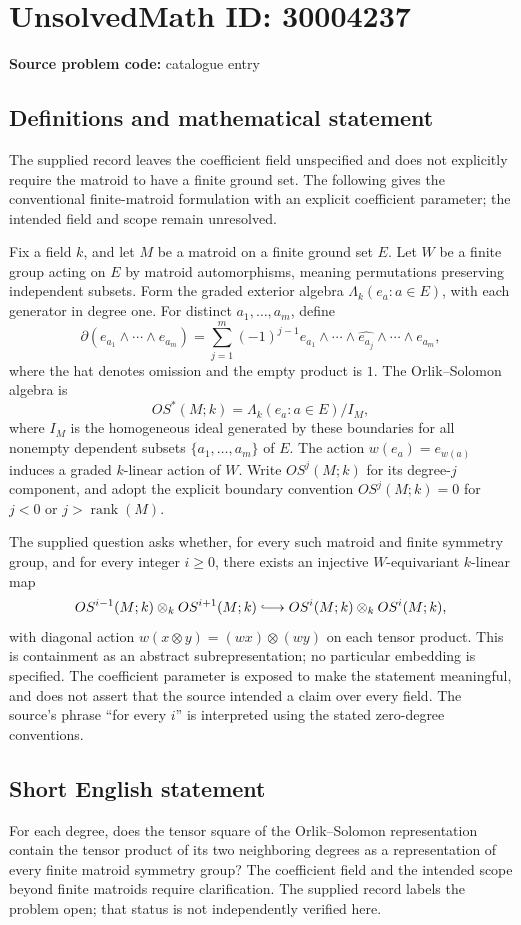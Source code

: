 \documentclass[11pt]{article}
\begin{document}
\section*{UnsolvedMath ID: 30004237}
\textbf{Source problem code:} catalogue entry
\subsection{Definitions and mathematical statement}
The supplied record leaves the coefficient field unspecified and does not explicitly require the matroid to have a finite ground set. The following gives the conventional finite-matroid formulation with an explicit coefficient parameter; the intended field and scope remain unresolved.

Fix a field \(k\), and let \(M\) be a matroid on a finite ground set \(E\). Let \(W\) be a finite group acting on \(E\) by matroid automorphisms, meaning permutations preserving independent subsets. Form the graded exterior algebra \(\Lambda_k(e_a:a\in E)\), with each generator in degree one. For distinct \(a_1,\ldots,a_m\), define
\[
\partial(e_{a_1}\wedge\cdots\wedge e_{a_m})
=\sum_{j=1}^{m}(-1)^{j-1}e_{a_1}\wedge\cdots\wedge\widehat{e_{a_j}}\wedge\cdots\wedge e_{a_m},
\]
where the hat denotes omission and the empty product is \(1\). The Orlik--Solomon algebra is
\[
OS^*(M;k)=\Lambda_k(e_a:a\in E)/I_M,
\]
where \(I_M\) is the homogeneous ideal generated by these boundaries for all nonempty dependent subsets \(\{a_1,\ldots,a_m\}\) of \(E\). The action \(w(e_a)=e_{w(a)}\) induces a graded \(k\)-linear action of \(W\). Write \(OS^j(M;k)\) for its degree-\(j\) component, and adopt the explicit boundary convention \(OS^j(M;k)=0\) for \(j<0\) or \(j>\operatorname{rank}(M)\).

The supplied question asks whether, for every such matroid and finite symmetry group, and for every integer \(i\geq 0\), there exists an injective \(W\)-equivariant \(k\)-linear map
\[
OS^{i-1}(M;k)\otimes_k OS^{i+1}(M;k)
\lhook\joinrel\longrightarrow
OS^i(M;k)\otimes_k OS^i(M;k),
\]
with diagonal action \(w(x\otimes y)=(wx)\otimes(wy)\) on each tensor product. This is containment as an abstract subrepresentation; no particular embedding is specified. The coefficient parameter is exposed to make the statement meaningful, and does not assert that the source intended a claim over every field. The source's phrase ``for every \(i\)'' is interpreted using the stated zero-degree conventions.
\subsection{Short English statement}
For each degree, does the tensor square of the Orlik--Solomon representation contain the tensor product of its two neighboring degrees as a representation of every finite matroid symmetry group? The coefficient field and the intended scope beyond finite matroids require clarification. The supplied record labels the problem open; that status is not independently verified here.
\end{document}
